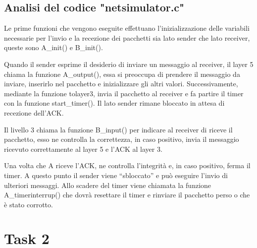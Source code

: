 \documentclass[a4paper]{article}
\begin{document}
\subsection{Analisi del codice "netsimulator.c"}
Le prime funzioni che vengono eseguite effettuano l’inizializzazione delle variabili necessarie per l’invio e la recezione dei pacchetti sia lato sender che lato receiver, queste sono A\_init() e B\_init(). 
\par Quando il sender esprime il desiderio di inviare un messaggio al receiver, il layer 5 chiama la funzione A\_output(), essa si preoccupa di prendere il messaggio da inviare, inserirlo nel pacchetto e inizializzare gli altri valori. Successivamente, mediante la funzione tolayer3, invia il pacchetto al receiver e fa partire il timer con la funzione start\_timer(). Il lato sender rimane bloccato in attesa di recezione dell’ACK. 
\par Il livello 3 chiama la funzione B\_input() per indicare al receiver di riceve il pacchetto, esso ne controlla la correttezza, in caso positivo, invia il messaggio ricevuto correttamente al layer 5 e l’ACK al layer 3. 
\par Una volta che A riceve l’ACK, ne controlla l’integrità e, in caso positivo, ferma il timer. A questo punto il sender viene “sbloccato” e può eseguire l’invio di ulteriori messaggi. Allo scadere del timer viene chiamata la funzione A\_timerinterrup() che dovrà resettare il timer e rinviare il pacchetto perso o che è stato corrotto.



\section{Task 2}
\end{document}
